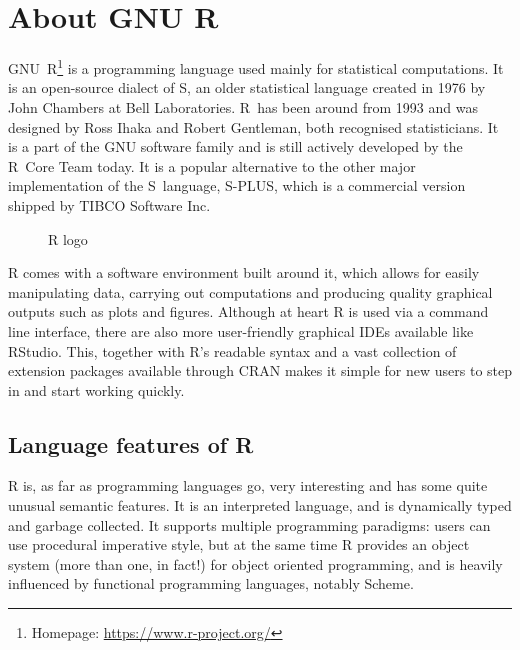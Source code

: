 \chapter{About GNU R}

GNU~R\footnote{Homepage: \url{https://www.r-project.org/}} is a programming language used mainly for statistical computations. It is an open-source dialect of S, an older statistical language created in 1976 by John Chambers at Bell Laboratories. R~has been around from 1993 and was designed by Ross Ihaka and Robert Gentleman, both recognised statisticians. It is a part of the GNU software family and is still actively developed by the R~Core Team today. It is a popular alternative to the other major implementation of the S~language, S-PLUS, which is a commercial version shipped by TIBCO Software Inc.
\todo[cite]

\begin{figure}[htbp]
\centering
{}
\caption{\label{fig:rlogo} R logo}
\end{figure}

R comes with a software environment built around it, which allows for easily manipulating data, carrying out computations and producing quality graphical outputs such as plots and figures. Although at heart R is used via a command line interface, there are also more user-friendly graphical IDEs available like RStudio. This, together with R's readable syntax and a vast collection of extension packages available through CRAN makes it simple for new users to step in and start working quickly.

\section{Language features of R}



R is, as far as programming languages go, very interesting and has some quite unusual semantic features. It is an interpreted language, and is dynamically typed and garbage collected. It supports multiple programming paradigms: users can use procedural imperative style, but at the same time R provides an object system (more than one, in fact!) for object oriented programming, and is heavily influenced by functional programming languages, notably Scheme.

